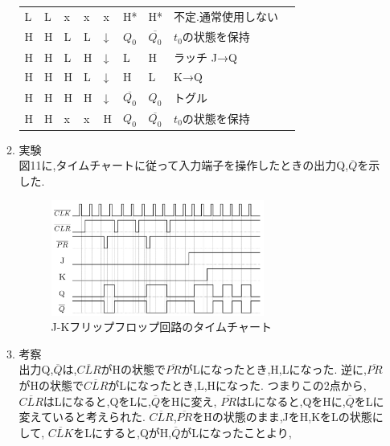 \documentclass[twocolumn, 10pt,a4j]{jsarticle}
\begin{document}
\begin{enumerate}
\begin{enumerate}
\begin{table}[H]
\begin{tabular}{lllll|ll|ll}
                L       & L       & x       & x       & x   & H*      & H*      & 不定.通常使用しない  \\
                H       & H       & L       & L       & ↓   & $Q_{0}$ & $\overline{Q_{0}}$ & $t_{0}$の状態を保持 \\
                H       & H       & L       & H       & ↓   & L       & H       & ラッチ J→Q \\
                H       & H       & H       & L       & ↓   & H       & L       & K→Q \\
                H       & H       & H       & H       & ↓   & $\overline{Q_{0}}$ & $Q_{0}$ & トグル \\
                H       & H       & x       & x       & H   & $Q_{0}$ & $\overline{Q_{0}}$ & $t_{0}$の状態を保持 
                \end{tabular}
            \end{table}
          \item 実験 \\
            図11に,タイムチャートに従って入力端子を操作したときの出力Q,$\overline{Q}$を示した.
            \begin{figure}[H]
              \begin{center}
                \includegraphics[width=7cm]{../img/junjokairo/jk_flip_flop_time_chart.png}
                \caption{J-Kフリップフロップ回路のタイムチャート}
              \end{center}
            \end{figure}
          \item 考察 \\
            出力Q,$\overline{Q}$は,$\overline{CLR}$がHの状態で$\overline{PR}$がLになったとき,H,Lになった.
            逆に,$\overline{PR}$がHの状態で$\overline{CLR}$がLになったとき,L,Hになった.
            つまりこの2点から,$\overline{CLR}$はLになると,QをLに,$\overline{Q}$をHに変え,
            $\overline{PR}$はLになると,QをHに,$\overline{Q}$をLに変えていると考えられた.
            $\overline{CLR}$,$\overline{PR}$をHの状態のまま,JをH,KをLの状態にして,
            $\overline{CLK}$をLにすると,QがH,$\overline{Q}$がLになったことより,

\end{enumerate}
\end{enumerate}
\end{document}
